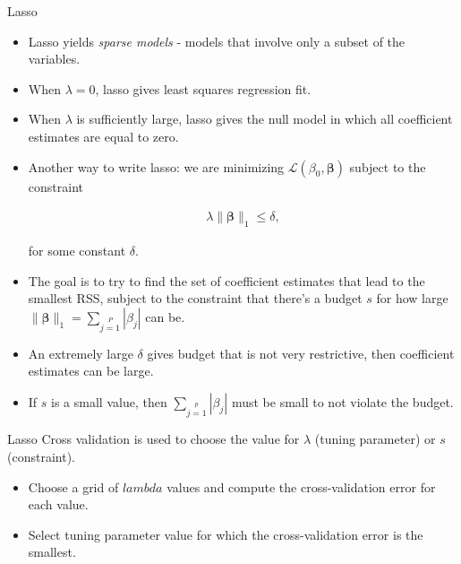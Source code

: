 \documentclass[8pt]{beamer}
\newcommand{\mydef}[1]{\textcolor{SteelBlue3}{\textit{#1}}} %
\begin{document}
\begin{frame}{Lasso}

\begin{itemize}

    \item  Lasso yields \mydef{sparse models} - models that involve only a subset of the variables. 
    
    \item When $\lambda = 0$, lasso gives least squares regression fit.
    
    \item When $\lambda$ is sufficiently large, lasso gives the null model in which all coefficient estimates are equal to zero. 
    
    \item Another way to write lasso: we are minimizing $\mathcal{L}(\beta_0, \bm{\beta})$ subject to the constraint
   
    \begin{align*}
        \lambda \| \bm{\beta} \|_{1} \le \delta,
    \end{align*}
    
for some constant $\delta$. 

    \item The goal is to try to find the set of coefficient estimates that lead to the smallest RSS, subject to the constraint that there's a budget $s$  for how large $\| \bm{\beta} \|_1 =  \sum\limits_{j=1}\limits^{P} |\beta_{j}|$ can be.
    
    \item An extremely large $\delta$ gives budget that is not very restrictive, then coefficient estimates can be large.
    \item If $s$ is a small value, then $\sum\limits_{j=1}\limits^{p} |\beta_{j}|$ must be small to not violate the budget. 

\end{itemize}

\end{frame}

\begin{frame}{Lasso}
    Cross validation is used to choose the value for $\lambda$ (tuning parameter) or $s$ (constraint).
\begin{itemize}
     \item Choose a grid of $lambda$ values and compute the cross-validation error for each value.
     \item Select tuning parameter value for which the cross-validation error is the smallest. 
\end{itemize}
\end{frame}
\end{document}
